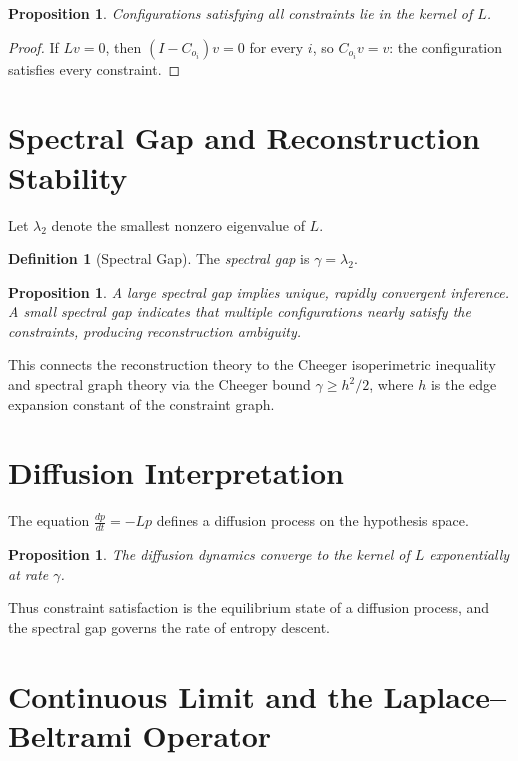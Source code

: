 \documentclass[12pt,a4paper,oneside]{book}
\numberwithin{equation}{chapter}
\theoremstyle{plain}
\newtheorem{proposition}[theorem]{Proposition}
\theoremstyle{definition}
\newtheorem{definition}[theorem]{Definition}
\theoremstyle{remark}
\begin{document}
\begin{proposition}
Configurations satisfying all constraints lie in the kernel of $L$.
\end{proposition}

\begin{proof}
If $Lv = 0$, then $(I - C_{o_i})v = 0$ for every $i$, so
$C_{o_i}v = v$: the configuration satisfies every constraint.
\end{proof}

\section{Spectral Gap and Reconstruction Stability}

Let $\lambda_2$ denote the smallest nonzero eigenvalue of $L$.

\begin{definition}[Spectral Gap]
The \emph{spectral gap} is $\gamma = \lambda_2$.
\end{definition}

\begin{proposition}
A large spectral gap implies unique, rapidly convergent inference.
A small spectral gap indicates that multiple configurations nearly
satisfy the constraints, producing reconstruction ambiguity.
\end{proposition}

This connects the reconstruction theory to the Cheeger isoperimetric
inequality and spectral graph theory via the Cheeger bound
$\gamma \geq h^2/2$, where $h$ is the edge expansion constant of the
constraint graph.

\section{Diffusion Interpretation}

The equation $\frac{dp}{dt} = -Lp$ defines a diffusion process on
the hypothesis space.

\begin{proposition}
The diffusion dynamics converge to the kernel of $L$ exponentially
at rate $\gamma$.
\end{proposition}

Thus constraint satisfaction is the equilibrium state of a diffusion
process, and the spectral gap governs the rate of entropy descent.

\section{Continuous Limit and the Laplace--Beltrami Operator}
\end{document}
